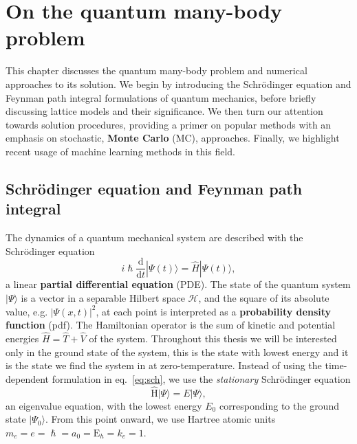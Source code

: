
\chapter{On the quantum many-body problem}
\label{chapter2}
This chapter discusses the quantum many-body problem and numerical approaches to its solution. We begin by introducing the Schr\" odinger equation and Feynman path integral formulations of quantum mechanics, before briefly discussing lattice models and their significance. We then turn our attention towards solution procedures, providing a primer on popular methods with an emphasis on stochastic, \textbf{Monte Carlo} (MC), approaches. Finally, we highlight recent usage of machine learning methods in this field.

\ifpdf
    \graphicspath{{Chapter2/Figs/Raster/}{Chapter2/Figs/PDF/}{Chapter2/Figs/}}
\else
    \graphicspath{{Chapter2/Figs/Vector/}{Chapter2/Figs/}}
\fi

\section{Schr{\"o}dinger equation and Feynman path integral}
\label{subsec:latt-qm}
The dynamics of a quantum mechanical system are described with the Schr\" odinger equation
\begin{equation}
\label{eq:sch}
i \hslash \frac{\mathrm{d}}{\mathrm{d} t}|\Psi(t)\rangle=\hat{H}|\Psi(t)\rangle,
\end{equation}
a linear \textbf{partial differential equation} (PDE). The state of the quantum system $| \Psi \rangle$ is a vector in a separable Hilbert space $\mathcal{H}$, and the square of its absolute value, e.g. $|\Psi(x, t)|^2$, at each point is interpreted as a \textbf{probability density function} (pdf). The Hamiltonian operator is the sum of kinetic and potential energies $\hat H = \hat T + \hat V$ of the system. Throughout this thesis we will be interested only in the ground state of the system, this is the state with lowest energy and it is the state we find the system in at zero-temperature. Instead of using the time-dependent formulation in eq.~\eqref{eq:sch}, we use the \emph{stationary} Schr\" odinger equation
\begin{equation}
\hat{\mathrm{H}}|\Psi\rangle=E|\Psi\rangle,
\end{equation}
an eigenvalue equation, with the lowest energy $E_0$ corresponding to the ground state $|\Psi_{0}\rangle$. From this point onward, we use Hartree atomic units $m_{e}=e=\hslash=a_{0}=\mathrm{E}_{h}=k_{e}=1$.

